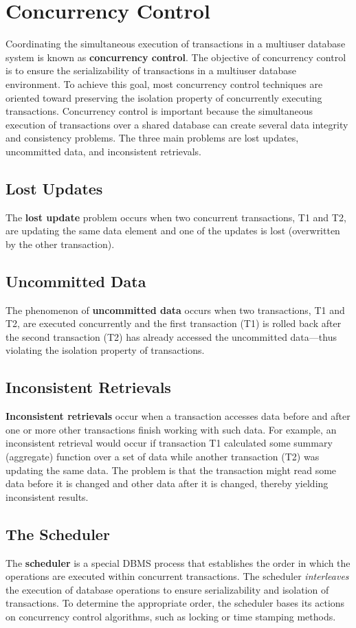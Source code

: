 \documentclass[a4paper, 11pt, titlepage]{report}
\begin{document}
\section{Concurrency Control}
Coordinating the simultaneous execution of transactions in a multiuser database system is known as \textbf{concurrency control}. The objective of concurrency control is to ensure the serializability of transactions in a multiuser database environment. To achieve this goal, most concurrency control techniques are oriented toward preserving the isolation property of concurrently executing transactions. Concurrency control is important because the simultaneous execution of transactions over a shared database can create several data integrity and consistency problems. The three main problems are lost updates, uncommitted data, and inconsistent retrievals.
\subsection{Lost Updates}
The \textbf{lost update} problem occurs when two concurrent transactions, T1 and T2, are updating the same data element and one of the updates is lost (overwritten by the other transaction).
\subsection{Uncommitted Data}
The phenomenon of \textbf{uncommitted data} occurs when two transactions, T1 and T2, are executed concurrently and the first transaction (T1) is rolled back after the second transaction (T2) has already accessed the uncommitted data—thus violating the isolation property of transactions.
\subsection{Inconsistent Retrievals}
\textbf{Inconsistent retrievals} occur when a transaction accesses data before and after one or more other transactions finish working with such data. For example, an inconsistent retrieval would occur if transaction T1 calculated some summary (aggregate) function over a set of data while another transaction (T2) was updating the same data. The problem is that the transaction might read some data before it is changed and other data after it is changed, thereby yielding inconsistent results.
\subsection{The Scheduler}
The \textbf{scheduler} is a special DBMS process that establishes the order in which the operations are executed within concurrent transactions. The scheduler \textit{interleaves} the execution of database operations to ensure serializability and isolation of transactions. To determine the appropriate order, the scheduler bases its actions on concurrency control algorithms, such as locking or time stamping methods.
\end{document}
